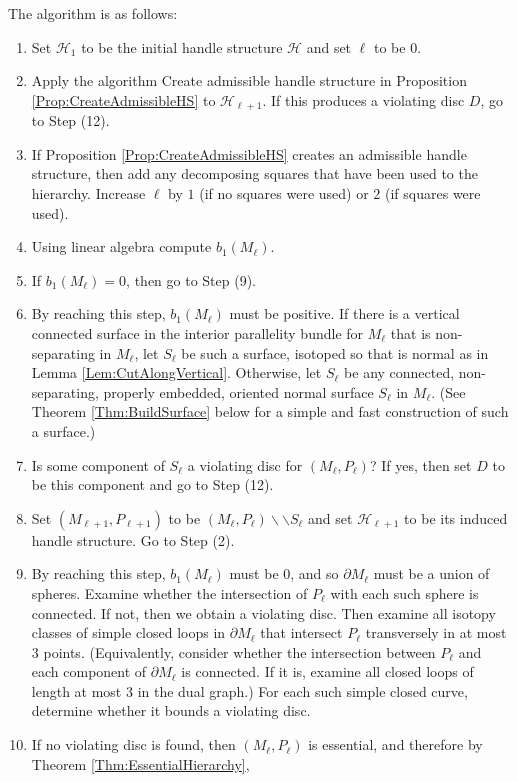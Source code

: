 \documentclass[oneside]{amsart}
\numberwithin{equation}{section}
\theoremstyle{plain}
\theoremstyle{definition}
\newcommand{\cut}{\backslash\backslash}
\begin{document}
The algorithm is as follows:
\begin{enumerate}
\item Set $\mathcal{ H}_1$ to be the initial handle structure $\mathcal{ H}$ and set $\ell$ to be 0.
\item Apply the algorithm {\sc Create admissible handle structure} in Proposition \ref{Prop:CreateAdmissibleHS} to $\mathcal{H}_{\ell + 1}$. If this produces a violating disc $D$, go to Step (12).
\item If Proposition \ref{Prop:CreateAdmissibleHS} creates an admissible handle structure, then add any decomposing squares that have been used to the hierarchy.
Increase $\ell$ by $1$ (if no squares were used) or $2$ (if squares were used).
\item Using linear algebra compute $b_1(M_\ell)$. 
\item If $b_1(M_\ell) = 0$, then go to Step (9).
\item By reaching this step, $b_1(M_\ell)$ must be positive. If there is a vertical connected surface in the interior parallelity bundle for $M_\ell$ that is non-separating in $M_\ell$, let $S_\ell$ be such a surface, isotoped so that is normal as in Lemma \ref{Lem:CutAlongVertical}. Otherwise, let $S_\ell$ be any connected, non-separating, properly embedded, oriented  normal surface $S_\ell$ in $M_\ell$. (See Theorem \ref{Thm:BuildSurface} below for a simple and fast construction of such a surface.)
\item Is some component of $S_\ell$ a violating disc for $(M_\ell, P_\ell)$? If yes, then set $D$ to be this component and go to Step (12).
\item Set $(M_{\ell+1}, P_{\ell+1})$ to be $(M_\ell, P_\ell) \cut S_\ell$ and set $\mathcal{ H}_{\ell+1}$ to be its induced handle structure. Go to Step (2).
\item By reaching this step, $b_1(M_\ell)$ must be $0$, and so $\partial M_\ell$ must be a union of spheres. Examine whether the intersection of $P_\ell$ with each such sphere is connected. If not, then we obtain a violating disc. Then examine all isotopy classes of simple closed loops in $\partial M_\ell$ that intersect $P_\ell$ transversely in at most 3 points. (Equivalently, consider whether the intersection between $P_\ell$ and each component of $\partial M_\ell$ is connected. If it is, examine all closed loops of length at most 3 in the dual graph.) For each such simple closed curve, determine whether it bounds a violating disc.
\item If no violating disc is found, then $(M_\ell, P_\ell)$ is essential, and therefore by Theorem \ref{Thm:EssentialHierarchy}, 

\end{enumerate}
\end{document}
